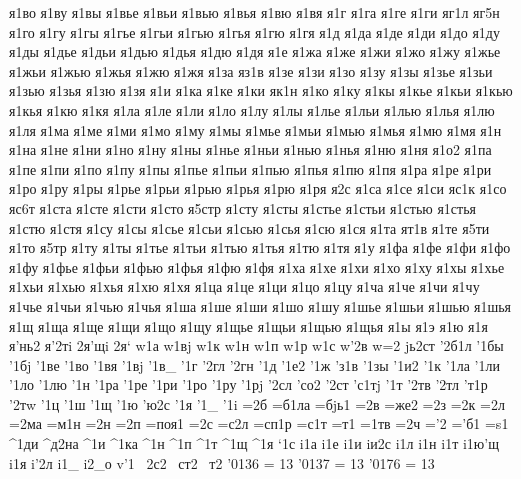 {{я1во
я1ву
я1вы
я1вье
я1вьи
я1вью
я1вья
я1вю
я1вя
я1г
я1га
я1ге
я1ги
яг1л
яг5н
я1го
я1гу
я1гы
я1гье
я1гьи
я1гью
я1гья
я1гю
я1гя
я1д
я1да
я1де
я1ди
я1до
я1ду
я1ды
я1дье
я1дьи
я1дью
я1дья
я1дю
я1дя
я1е
я1жа
я1же
я1жи
я1жо
я1жу
я1жье
я1жьи
я1жью
я1жья
я1жю
я1жя
я1за
яз1в
я1зе
я1зи
я1зо
я1зу
я1зы
я1зье
я1зьи
я1зью
я1зья
я1зю
я1зя
я1и
я1ка
я1ке
я1ки
як1н
я1ко
я1ку
я1кы
я1кье
я1кьи
я1кью
я1кья
я1кю
я1кя
я1ла
я1ле
я1ли
я1ло
я1лу
я1лы
я1лье
я1льи
я1лью
я1лья
я1лю
я1ля
я1ма
я1ме
я1ми
я1мо
я1му
я1мы
я1мье
я1мьи
я1мью
я1мья
я1мю
я1мя
я1н
я1на
я1не
я1ни
я1но
я1ну
я1ны
я1нье
я1ньи
я1нью
я1нья
я1ню
я1ня
я1о2
я1па
я1пе
я1пи
я1по
я1пу
я1пы
я1пье
я1пьи
я1пью
я1пья
я1пю
я1пя
я1ра
я1ре
я1ри
я1ро
я1ру
я1ры
я1рье
я1рьи
я1рью
я1рья
я1рю
я1ря
я2с
я1са
я1се
я1си
яс1к
я1со
яс6т
я1ста
я1сте
я1сти
я1сто
я5стр
я1сту
я1сты
я1стье
я1стьи
я1стью
я1стья
я1стю
я1стя
я1су
я1сы
я1сье
я1сьи
я1сью
я1сья
я1сю
я1ся
я1та
ят1в
я1те
я5ти
я1то
я5тр
я1ту
я1ты
я1тье
я1тьи
я1тью
я1тья
я1тю
я1тя
я1у
я1фа
я1фе
я1фи
я1фо
я1фу
я1фье
я1фьи
я1фью
я1фья
я1фю
я1фя
я1ха
я1хе
я1хи
я1хо
я1ху
я1хы
я1хье
я1хьи
я1хью
я1хья
я1хю
я1хя
я1ца
я1це
я1ци
я1цо
я1цу
я1ча
я1че
я1чи
я1чу
я1чье
я1чьи
я1чью
я1чья
я1ша
я1ше
я1ши
я1шо
я1шу
я1шье
я1шьи
я1шью
я1шья
я1щ
я1ща
я1ще
я1щи
я1що
я1щу
я1щье
я1щьи
я1щью
я1щья
я1ы
я1э
я1ю
я1я
я'нь2
я'2тi
2я'щi
2я`
w1а
w1вj
w1к
w1н
w1п
w1р
w1с
w'2в
w=2
jь2ст
'2б1л
'1бы
'1бj
'1ве
'1во
'1вя
'1вj
'1в_
'1г
'2гл
'2гн
'1д
'1е2
'1ж
'з1в
'1зы
'1и2
'1к
'1ла
'1ли
'1ло
'1лю
'1н
'1ра
'1ре
'1ри
'1ро
'1ру
'1рj
'2сл
'со2
'2ст
'с1тj
'1т
'2тв
'2тл
'т1р
'2тw
'1ц
'1ш
'1щ
'1ю
'ю2с
'1я
'1_
'1i
=2б
=б1ла
=бjь1
=2в
=же2
=2з
=2к
=2л
=2ма
=м1н
=2н
=2п
=поя1
=2с
=с2л
=сп1р
=с1т
=т1
=1тв
=2ч
='2
='б1
=s1
^1ди
^д2на
^1и
^1ка
^1н
^1п
^1т
^1щ
^1я
`1с
i1а
i1е
i1и
iи2с
i1л
i1н
i1т
i1ю'щ
i1я
i'2л
i1_
i2_о
v'1
~2с2
~ст2
~т2
}}
\catcode '0136 = 13
\catcode '0137 = 13
\catcode '0176 = 13
